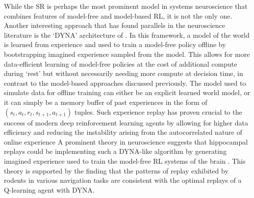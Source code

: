 While the SR is perhaps the most prominent model in systems neuroscience that combines features of model-free and model-based RL, it is not the only one.
Another interesting approach that has found parallels in the neuroscience literature is the `DYNA' architecture of \citet{sutton1991dyna}.
In this framework, a model of the world is learned from experience and used to train a model-free policy offline by bootstrapping imagined experience sampled from the model.
This allows for more data-efficient learning of model-free policies at the cost of additional compute during `rest' but without necessarily needing more compute at decision time, in contrast to the model-based approaches discussed previously.
The model used to simulate data for offline training can either be an explicit learned world model, or it can simply be a memory buffer of past experiences in the form of $(s_t, a_t, r_t, s_{t+1}, a_{t+1})$ tuples.
Such experience replay has proven crucial to the success of modern deep reinforcement learning agents by allowing for higher data efficiency and reducing the instability arising from the autocorrelated nature of online experience \citep{mnih2013playing,schaul2015prioritized}
A prominent theory in neuroscience suggests that hippocampal replays could be implementing such a DYNA-like algorithm by generating imagined experience used to train the model-free RL systems of the brain \citep{mattar2018prioritized}.
This theory is supported by the finding that the patterns of replay exhibited by rodents in various navigation tasks are consistent with the optimal replays of a Q-learning agent with DYNA.

